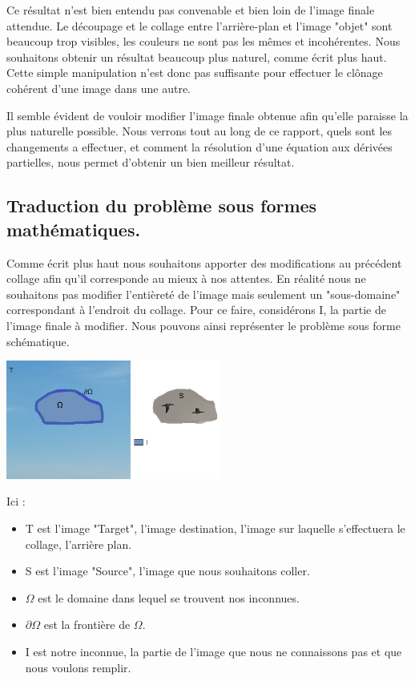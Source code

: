 Ce résultat n'est bien entendu pas convenable et bien loin de l'image finale attendue. Le découpage et le collage entre l'arrière-plan et l'image "objet" sont beaucoup trop visibles, les couleurs ne sont pas les mêmes et incohérentes. Nous souhaitons obtenir un résultat beaucoup plus naturel, comme écrit plus haut. Cette simple manipulation n'est donc pas suffisante pour effectuer le clônage cohérent  d'une image dans une autre. \newline

Il semble évident de vouloir modifier l'image finale obtenue afin qu'elle paraisse la plus naturelle possible. Nous verrons tout au long de ce rapport, quels sont les changements a effectuer, et comment la résolution d'une équation aux dérivées partielles, nous permet d'obtenir un bien meilleur résultat. 


\subsection{Traduction du problème sous formes mathématiques.}

Comme écrit plus haut nous souhaitons apporter des modifications au précédent collage afin qu'il corresponde au mieux à nos attentes. En réalité nous ne souhaitons pas modifier l'entièreté de l'image mais seulement un "sous-domaine" correspondant à l'endroit du collage. Pour ce faire, considérons I, la partie de l'image finale à modifier. Nous pouvons ainsi représenter le problème sous forme schématique. 
\begin{center}
    \includegraphics[width = 200pt]{Images/Schee.jpg}
\end{center}

Ici : 
\begin{itemize}
    \item T est l'image "Target", l'image destination, l'image sur laquelle s'effectuera le collage, l'arrière plan. 
    \item S est l'image "Source", l'image que nous souhaitons coller.
    \item $\Omega$ est le domaine dans lequel se trouvent nos inconnues.
    \item $\partial \Omega$ est la frontière de $\Omega$.
    \item I est notre inconnue, la partie de l'image que nous ne connaissons pas et que nous voulons remplir.
\end{itemize}

